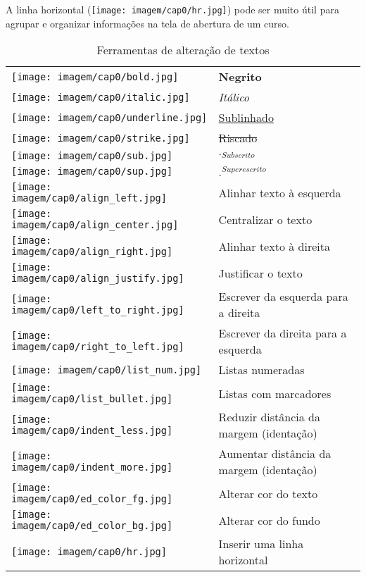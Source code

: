 A linha horizontal (\texttt{[image: imagem/cap0/hr.jpg]}) pode ser muito útil para agrupar e organizar informações na tela de abertura de um curso.

\begin{table}
\begin{center}
 \begin{tabular}{m{0.5cm} m{6.0cm}} \\
  \texttt{[image: imagem/cap0/bold.jpg]} & \textbf{Negrito} \\
  \texttt{[image: imagem/cap0/italic.jpg]} & \textit{Itálico} \\
  \texttt{[image: imagem/cap0/underline.jpg]} & \underline{Sublinhado} \\
  \texttt{[image: imagem/cap0/strike.jpg]} & \sout{Riscado} \\
  \texttt{[image: imagem/cap0/sub.jpg]} & $._{Subscrito}$ \\
  \texttt{[image: imagem/cap0/sup.jpg]} & $.^{Superescrito}$ \\ 
  \texttt{[image: imagem/cap0/align\_left.jpg]} & Alinhar texto à esquerda \\
  \texttt{[image: imagem/cap0/align\_center.jpg]} & Centralizar o texto \\
  \texttt{[image: imagem/cap0/align\_right.jpg]} & Alinhar texto à direita \\ 
  \texttt{[image: imagem/cap0/align\_justify.jpg]} & Justificar o texto \\
  \texttt{[image: imagem/cap0/left\_to\_right.jpg]} & Escrever da esquerda para a direita \\
  \texttt{[image: imagem/cap0/right\_to\_left.jpg]} & Escrever da direita para a esquerda \\
  \texttt{[image: imagem/cap0/list\_num.jpg]} & Listas numeradas \\
  \texttt{[image: imagem/cap0/list\_bullet.jpg]} & Listas com marcadores \\
  \texttt{[image: imagem/cap0/indent\_less.jpg]} & Reduzir distância da margem (identação) \\
  \texttt{[image: imagem/cap0/indent\_more.jpg]} & Aumentar distância da margem (identação) \\
  \texttt{[image: imagem/cap0/ed\_color\_fg.jpg]} & Alterar cor do texto \\
  \texttt{[image: imagem/cap0/ed\_color\_bg.jpg]} & Alterar cor do fundo \\
  \texttt{[image: imagem/cap0/hr.jpg]} & Inserir uma linha horizontal \\ \hline
 \end{tabular}
\caption{Ferramentas de alteração de textos}
\end{center}
\end{table}


